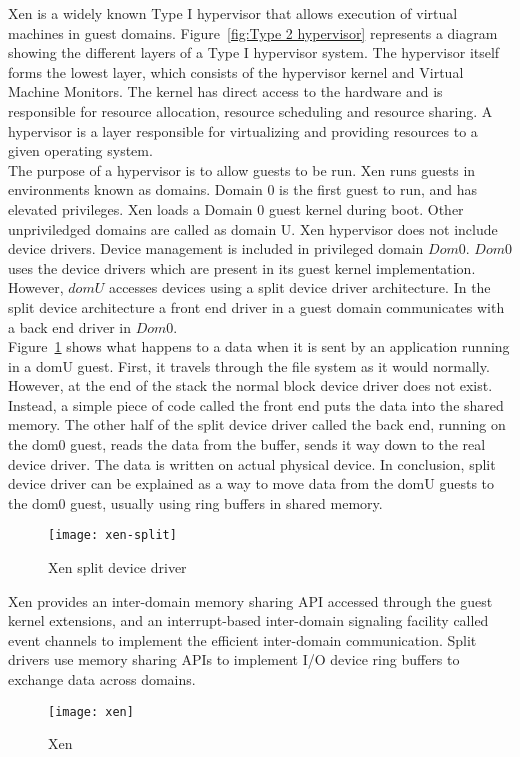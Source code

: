 Xen\cite{Barham:2003:XAV:1165389.945462} is a widely known Type I hypervisor that allows execution of virtual machines in guest domains\cite{King_operatingsystem}. Figure~\ref{fig:Type 2 hypervisor} represents a diagram showing the different layers of a Type I hypervisor system. The hypervisor itself forms the lowest layer, which consists of the hypervisor kernel and Virtual Machine Monitors. The kernel has direct access to the hardware and is responsible for resource allocation, resource scheduling and resource sharing. A hypervisor is a layer responsible for virtualizing and providing resources to a given operating system.
\\
The purpose of a hypervisor is to allow guests to be run. Xen runs guests in environments known as domains. Domain 0 is the first guest to run, and has elevated privileges. Xen loads a Domain 0 guest kernel during boot. Other unpriviledged domains are called as domain U. Xen hypervisor does not include device drivers. Device management is included in privileged domain $Dom 0$. $Dom 0$ uses the device drivers which are present in its guest kernel implementation. However, $dom U$ accesses devices using a split device driver architecture. In the split device architecture a front end driver in a guest domain communicates with a back end driver in $Dom 0$.
\\
Figure~\ref{xen-split2} shows what happens to a data when it is sent by an application running in a domU guest. First, it travels through the file system as it would normally. However, at the end of the stack the normal block device driver does not exist. Instead, a simple piece of code called the front end puts the data into the shared memory. The other half of the split device driver called the back end, running on the dom0 guest, reads the data from the buffer, sends it way down to the real device driver. The data is written on actual physical device. In conclusion, split device driver can be explained as a way to move data from the domU guests to the dom0 guest, usually using ring buffers in shared memory\cite{Chisnall:2007:DGX:1407351}.
\begin{figure}[!h]
\centering
\texttt{[image: xen-split]}
\caption{Xen split device driver}
\label{xen-split2}
\end{figure}

Xen provides an inter-domain memory sharing API accessed through the guest kernel extensions, and an interrupt-based inter-domain signaling facility called event channels to implement the efficient inter-domain communication. Split drivers use memory sharing APIs to implement I/O device ring buffers to exchange data across domains.
\\
\begin{figure}[!h]
\centering
\texttt{[image: xen]}
\caption{Xen}
\label{xen}
\end{figure}

